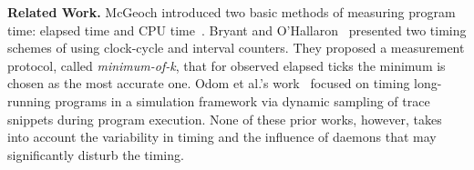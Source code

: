 \documentclass[letter]{ieice}
\begin{document}

{\bf Related Work.} 
McGeoch introduced
two basic methods of measuring program time: elapsed time and CPU time~\cite{Mcgeoch12}. 
Bryant and O'Hallaron~\cite{Randal03} 
presented two timing schemes of using clock-cycle and interval counters. 
They proposed a measurement protocol, called {\em minimum-of-k}, 
that for observed elapsed ticks the minimum is chosen as the most accurate one. 
Odom et al.'s work~\cite{Odom05} focused on timing long-running programs 
in a simulation framework via dynamic sampling of trace snippets during program execution. 
None of these prior works, however, takes into account the variability in 
timing and the influence of daemons that may significantly disturb the timing.

\end{document}

